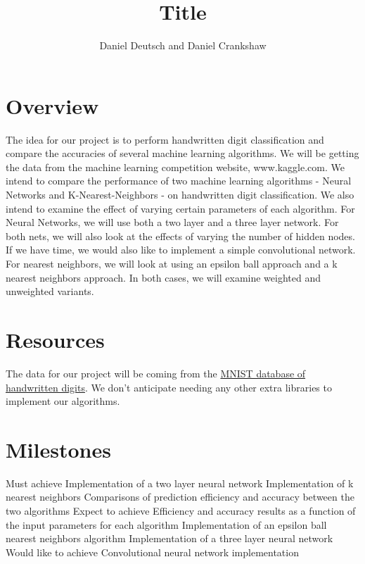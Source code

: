 \documentclass[11pt,a4paper]{article}
\author{Daniel Deutsch and Daniel Crankshaw}
\title{Title}
\date{}
\begin{document}
\maketitle
\section*{Overview}
The idea for our project is to perform handwritten digit classification and compare the accuracies of several machine learning algorithms. We will be getting the data from the machine learning competition website, www.kaggle.com. We intend to compare the performance of two machine learning algorithms - Neural Networks and K-Nearest-Neighbors - on handwritten digit classification. We also intend to examine the effect of varying certain parameters of each algorithm. For Neural Networks, we will use both a two layer and a three layer network. For both nets, we will also look at the effects of varying the number of hidden nodes. If we have time, we would also like to implement a simple convolutional network. For nearest neighbors, we will look at using an epsilon ball approach and a k nearest neighbors approach. In both cases, we will examine weighted and unweighted variants.

\section*{Resources}
The data for our project will be coming from the \href{http://yann.lecun.com/exdb/mnist/index.html}{MNIST database of handwritten digits}. We don’t anticipate needing any other extra libraries to implement our algorithms.

\section*{Milestones}
Must achieve
Implementation of a two layer neural network
Implementation of k nearest neighbors
Comparisons of prediction efficiency and accuracy between the two algorithms
Expect to achieve
Efficiency and accuracy results as a function of the input parameters for each algorithm
Implementation of an epsilon ball nearest neighbors algorithm
Implementation of a three layer neural network
Would like to achieve
Convolutional neural network implementation
\end{document}

